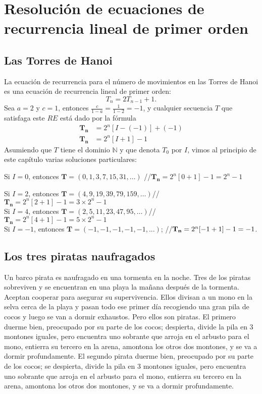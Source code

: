 \section{Resolución de ecuaciones de recurrencia lineal de primer orden}

\subsection{Las Torres de Hanoi}

La ecuación de recurrencia para el número de movimientos en las Torres de Hanoi es una ecuación de recurrencia lineal de primer orden:
\begin{equation*}
T_{n}=2T_{n-1}+1.
\end{equation*}
Sea $a=2$ y $c=1$, entonces $\frac{c}{1-a}=\frac{1}{1-2}=-1$, y cualquier secuencia $T$ que satisfaga este $RE$ está dado por la fórmula
\begin{align*}
\bm{T_{n}}&=2^{n}\left[I-(-1)\right]+(-1)\\
\bm{T_{n}}&=2^{n}\left[I+1\right]-1
\end{align*}
Asumiendo que $T$ tiene el dominio $\mathds{N}$ y que denota $T_0$ por $I$, vimos al principio de este capítulo varias soluciones particulares:

Si $I=0$, entonces $\bm{T}=\left(0,1,3,7,15,31,\ldots\right)$ //$\bm{T_{n}}=2^{n}[0+1]-1=2^n-1$

Si $I=2$, entonces $\bm{T}=\left(4,9,19,39,79,159,\ldots\right)$//$\bm{T_{n}}=2^{n}[2+1]-1=3\times2^n -1$ \\

Si $I=4$, entonces $\bm{T}=\left(2,5,11,23,47,95,\ldots\right)$//$\bm{T_{n}}=2^{n}[4+1]-1=5\times2^n -1$ \\

Si $I=-1$, entonces $\bm{T}= (-1,-1,-1,-1,-1,...)$; \;\;  //${\bf T_n} = 2^{n}[-1+1]-1=-1$.

\subsection{Los tres piratas naufragados}

Un barco pirata es naufragado en una tormenta en la noche. Tres de los piratas sobreviven y se encuentran en una playa la mañana después de la tormenta. Aceptan cooperar para asegurar su supervivencia. Ellos divisan a un mono en la selva cerca de la playa y pasan todo ese primer día recogiendo una gran pila de cocos y luego se van a dormir exhaustos. Pero ellos son piratas. El primero duerme bien, preocupado por su parte de los cocos; despierta, divide la pila en 3 montones iguales, pero encuentra uno sobrante que arroja en el arbusto para el mono, entierra su tercero en la arena, amontona los otros dos montones, y se va a dormir profundamente. El segundo pirata duerme bien, preocupado por su parte de los cocos; se despierta, divide la pila en 3 montones iguales, pero encuentra uno sobrante que arroja en el arbusto para el mono, entierra su tercero en la arena, amontona los otros dos montones, y se va a dormir profundamente.

